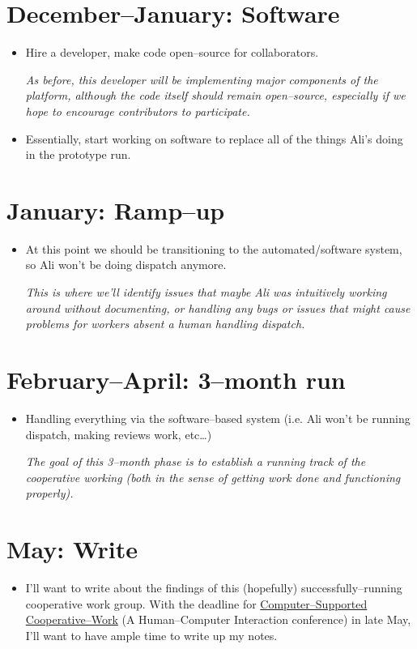\documentclass[11pt]{article}
\begin{document}
\section*{December--January: Software}
  \begin{itemize}
    \item Hire a developer, make code open--source for collaborators.

    \textit{As before, this developer will be implementing major components of the platform, although the code itself should remain open--source, especially if we hope to encourage contributors to participate.}
    \item Essentially, start working on software to replace all of the things Ali's doing in the prototype run.
  \end{itemize}
\section*{January: Ramp--up}
  \begin{itemize}
    \item At this point we should be transitioning to the automated/software system,
    so Ali won't be doing dispatch anymore.
    
    \textit{
      This is where we'll identify issues that maybe Ali was intuitively working around without documenting,
      or handling any bugs or issues that might cause problems for workers absent a human handling dispatch.}
  \end{itemize}
\section*{February--April: 3--month run}
  \begin{itemize}
    \item Handling everything via the software--based system (i.e. Ali won't be running dispatch, making reviews work, etc\dots)

    \textit{The goal of this 3--month phase is to establish a running track of the cooperative working (both in the sense of getting work done and functioning properly).}
  \end{itemize}
\section*{May: Write}
  \begin{itemize}
    \item I'll want to write about the findings of this
    (hopefully) successfully--running cooperative work group.
    With the deadline for \href{http://cscw.acm.org/2016/index.php}{Computer--Supported Cooperative--Work}
    (A Human--Computer Interaction conference) in late May,
    I'll want to have ample time to write up my notes.
  \end{itemize}
\end{document}
